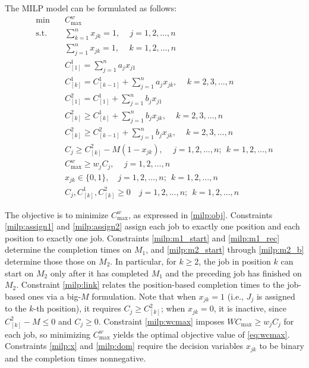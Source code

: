 ﻿\documentclass[12pt]{article} \textheight=24.5cm \textwidth=16.5cm \parskip = 0.165cm
\begin{document}
\begin{sloppypar}
        The MILP model can be formulated as follows:
        \begin{align}
            \min \quad & C_{\max}^w \label{milp:obj} \\
            \text{s.t.} \quad & \sum_{k=1}^{n} x_{jk} = 1, \quad \, j = 1, 2,\dots, n \label{milp:assign1} \\
            & \sum_{j=1}^{n} x_{jk} = 1, \quad \, k = 1, 2, \ldots,n \label{milp:assign2} \\
            & C_{[1]}^1 = \sum_{j=1}^{n} a_j x_{j1} \label{milp:m1_start} \\
            & C_{[k]}^1 = C_{[k-1]}^1 + \sum_{j=1}^{n} a_j x_{jk}, \quad \, k = 2, 3, \ldots, n \label{milp:m1_rec} \\
            & C_{[1]}^2 = C_{[1]}^1 + \sum_{j=1}^{n} b_j x_{j1} \label{milp:m2_start} \\
            & C_{[k]}^2 \geq C_{[k]}^1 + \sum_{j=1}^{n} b_j x_{jk}, \quad \, k = 2, 3, \ldots, n \label{milp:m2_a} \\
            & C_{[k]}^2 \geq C_{[k-1]}^2 + \sum_{j=1}^{n} b_j x_{jk}, \quad \, k = 2, 3, \ldots, n \label{milp:m2_b} \\
            & C_j \geq C_{[k]}^2 - M(1 - x_{jk}), \quad \, j = 1, 2, \ldots, n; ~~ k = 1, 2, \ldots, n \label{milp:link} \\
            & C_{\max}^w \geq w_j C_j, \quad \, j = 1, 2, \ldots,n \label{milp:wcmax} \\
            & x_{jk} \in \{0, 1\},\quad j=1, 2, \ldots, n; ~~ k=1, 2, \ldots, n \label{milp:x}\\
            & C_j, C_{[k]}^1, C_{[k]}^2 \geq 0 \quad j=1, 2, \ldots, n; ~~ k=1, 2, \ldots, n \label{milp:dom}
        \end{align}

        The objective is to minimize $C_{\max}^w$, as expressed in \cref{milp:obj}.
        Constraints \cref{milp:assign1} and \cref{milp:assign2} assign each job to exactly one position and each position to exactly one job.
        Constraints \cref{milp:m1_start} and \cref{milp:m1_rec} determine the completion times on $M_1$, and \cref{milp:m2_start} through \cref{milp:m2_b} determine those those on $M_2$.
        In particular, for $k \geq 2$, the job in position $k$ can start on $M_2$ only after it has completed $M_1$ and the preceding job has finished on $M_2$.
        Constraint \cref{milp:link} relates the position-based completion times to the job-based ones via a big-$M$ formulation.
        Note that when $x_{jk} = 1$ (i.e., $J_j$ is assigned to the $k$-th position), it requires $C_j \geq C_{[k]}^2$; when $x_{jk} = 0$, it is inactive, since $C_{[k]}^2 - M \leq 0$ and $C_j \geq 0$.
        Constraint \cref{milp:wcmax} imposes  $W C_{\max} \geq w_j C_j$ for each job, so minimizing $C_{\max}^w$ yields the optimal objective value of \cref{eq:wcmax}.
        Constraints \cref{milp:x} and \cref{milp:dom} require the decision variables $x_{jk}$ to be binary and the completion times nonnegative.


\end{sloppypar}
\end{document}
